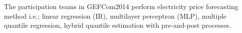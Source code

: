\documentclass[review]{elsarticle}
\begin{document}
    The participation teams in GEFCom2014 perform electricity price forecasting method i.e.; linear regression (IR)\cite{Dudek2016}, multilayer perceptron (MLP)\cite{Dudek2016},  multiple quantile regression\cite{Juban2016}, hybrid quantile estimation with pre-and-post processes\cite{Maciejowska2016}.
\end{document}
